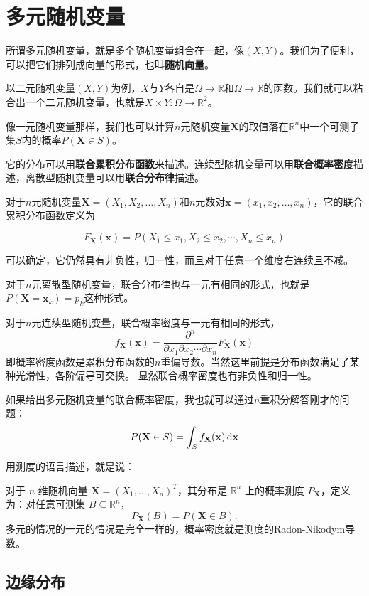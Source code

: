 
\section{多元随机变量}

所谓多元随机变量，就是多个随机变量组合在一起，像$(X,Y)$。我们为了便利，可以把它们排列成向量的形式，也叫\textbf{随机向量}。

以二元随机变量\((X,Y)\)为例，\(X\)与\(Y\)各自是\(\Omega\to \mathbb{R}\)和\(\Omega\to \mathbb{R}\)的函数。我们就可以粘合出一个二元随机变量，也就是\(X\times Y: \Omega \to \mathbb{R}^2\)。

像一元随机变量那样，我们也可以计算$n$元随机变量$\mathbf{X}$的取值落在$\mathbb{R}^n$中一个可测子集$S$内的概率$P(\mathbf{X}\in S)$。

它的分布可以用\textbf{联合累积分布函数}来描述。连续型随机变量可以用\textbf{联合概率密度}描述，离散型随机变量可以用\textbf{联合分布律}描述。

对于$n$元随机变量$\mathbf{X}=(X_1,X_2,\ldots,X_n)$和$n$元数对$\mathbf{x}=(x_1,x_2,\ldots,x_n)$，它的联合累积分布函数定义为

\[
F_{\mathbf{X}}(\mathbf{x})=P(X_1\leq x_1,X_2 \leq x_2, \cdots ,X_n \leq x_n)
\]

可以确定，它仍然具有非负性，归一性，而且对于任意一个维度右连续且不减。

对于$n$元离散型随机变量，联合分布律也与一元有相同的形式，也就是$P(\mathbf{X}=\mathbf{x}_k)=p_k$这种形式。

对于$n$元连续型随机变量，联合概率密度与一元有相同的形式，
\[
    f_{\mathbf{X}}(\mathbf{x}) = \frac{\partial^n}{\partial x_1 \partial x_2 \cdots \partial x_n} F_{\mathbf{X}}(\mathbf{x})
\]
即概率密度函数是累积分布函数的$n$重偏导数。当然这里前提是分布函数满足了某种光滑性，各阶偏导可交换。
显然联合概率密度也有非负性和归一性。



如果给出多元随机变量的联合概率密度，我也就可以通过$n$重积分解答刚才的问题：
\[
P(\mathbf{X}\in S)=\int_{S}f_{\mathbf{X}}(\mathbf{x})\mathop{}\!\mathrm{d}\mathbf{x}
\]

用测度的语言描述，就是说：

对于 $n$ 维随机向量 $\mathbf{X} = (X_1, \dots, X_n)^T$，其分布是 $\mathbb{R}^n$ 上的概率测度 $P_{\mathbf{X}}$，定义为：对任意可测集 $B \subseteq \mathbb{R}^n$，
\[
P_{\mathbf{X}}(B) = P(\mathbf{X} \in B).
\]
多元的情况的一元的情况是完全一样的，概率密度就是测度的Radon-Nikodym导数。

\subsection{边缘分布}

